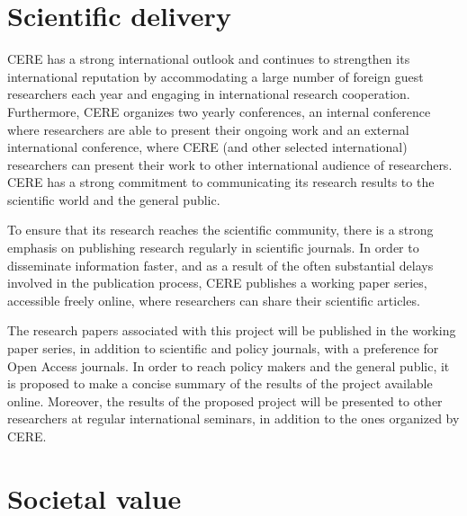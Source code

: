 \section{Scientific delivery}
CERE has a strong international outlook and continues to strengthen its international reputation by accommodating a large number of foreign guest researchers each year and engaging in international research cooperation. Furthermore, CERE organizes two yearly conferences, an internal conference where researchers are able to present their ongoing work and an external international conference, where CERE (and other selected international) researchers can present their work to other international audience of researchers. CERE has a strong commitment to communicating its research results to the scientific world and the general public.

To ensure that its research reaches the scientific community, there is a strong emphasis on publishing research regularly in scientific journals. In order to disseminate information faster, and as a result of the often substantial delays involved in the publication process, CERE publishes a working paper series, accessible freely online, where researchers can share their scientific articles.

The research papers associated with this project will be published in the working paper series, in addition to scientific and policy journals, with a preference for Open Access journals. In order to reach policy makers and the general public, it is proposed to make a concise summary of the results of the project available online. Moreover, the results of the proposed project will be presented to other researchers at regular international seminars, in addition to the ones organized by CERE.

\section{Societal value}


